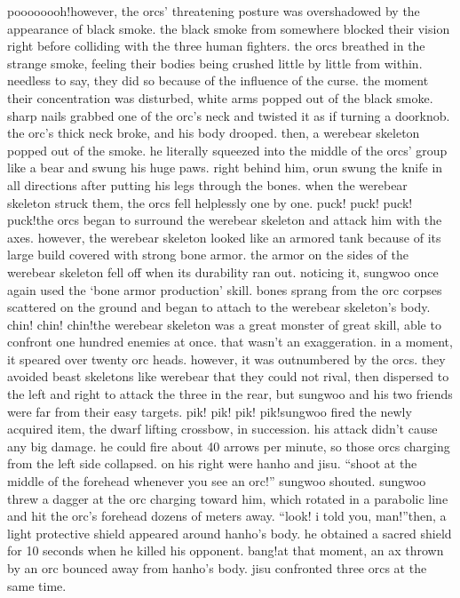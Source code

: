 poooooooh!however, the orcs’ threatening posture was overshadowed by the appearance of black smoke.
 the black smoke from somewhere blocked their vision right before colliding with the three human fighters.
the orcs breathed in the strange smoke, feeling their bodies being crushed little by little from within.
 needless to say, they did so because of the influence of the curse.
 the moment their concentration was disturbed, white arms popped out of the black smoke.
sharp nails grabbed one of the orc’s neck and twisted it as if turning a doorknob.
 the orc’s thick neck broke, and his body drooped.
then, a werebear skeleton popped out of the smoke.
 he literally squeezed into the middle of the orcs’ group like a bear and swung his huge paws.
right behind him, orun swung the knife in all directions after putting his legs through the bones.
when the werebear skeleton struck them, the orcs fell helplessly one by one.
puck! puck! puck! puck!the orcs began to surround the werebear skeleton and attack him with the axes.
however, the werebear skeleton looked like an armored tank because of its large build covered with strong bone armor.
the armor on the sides of the werebear skeleton fell off when its durability ran out.
noticing it, sungwoo once again used the ‘bone armor production’ skill.
bones sprang from the orc corpses scattered on the ground and began to attach to the werebear skeleton’s body.
chin! chin! chin!the werebear skeleton was a great monster of great skill, able to confront one hundred enemies at once.
 that wasn’t an exaggeration.
 in a moment, it speared over twenty orc heads.
however, it was outnumbered by the orcs.
 they avoided beast skeletons like werebear that they could not rival, then dispersed to the left and right to attack the three in the rear, but sungwoo and his two friends were far from their easy targets.
pik! pik! pik! pik!sungwoo fired the newly acquired item, the dwarf lifting crossbow, in succession.
his attack didn’t cause any big damage.
 he could fire about 40 arrows per minute, so those orcs charging from the left side collapsed.
on his right were hanho and jisu.
“shoot at the middle of the forehead whenever you see an orc!” sungwoo shouted.
sungwoo threw a dagger at the orc charging toward him, which rotated in a parabolic line and hit the orc’s forehead dozens of meters away.
“look! i told you, man!”then, a light protective shield appeared around hanho’s body.
 he obtained a sacred shield for 10 seconds when he killed his opponent.
bang!at that moment, an ax thrown by an orc bounced away from hanho’s body.
jisu confronted three orcs at the same time.
